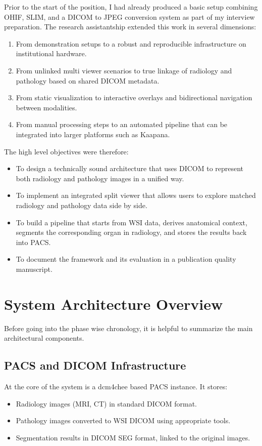 \documentclass[11pt,a4paper]{article}
\begin{document}
Prior to the start of the position, I had already produced a basic setup combining OHIF, SLIM, and a DICOM to JPEG conversion system as part of my interview preparation. The research assistantship extended this work in several dimensions:
\begin{enumerate}
    \item From demonstration setups to a robust and reproducible infrastructure on institutional hardware.
    \item From unlinked multi viewer scenarios to true linkage of radiology and pathology based on shared DICOM metadata.
    \item From static visualization to interactive overlays and bidirectional navigation between modalities.
    \item From manual processing steps to an automated pipeline that can be integrated into larger platforms such as Kaapana.
\end{enumerate}

The high level objectives were therefore:
\begin{itemize}
    \item To design a technically sound architecture that uses DICOM to represent both radiology and pathology images in a unified way.
    \item To implement an integrated split viewer that allows users to explore matched radiology and pathology data side by side.
    \item To build a pipeline that starts from WSI data, derives anatomical context, segments the corresponding organ in radiology, and stores the results back into PACS.
    \item To document the framework and its evaluation in a publication quality manuscript.
\end{itemize}

\section{System Architecture Overview}
\label{sec:architecture}

Before going into the phase wise chronology, it is helpful to summarize the main architectural components.

\subsection{PACS and DICOM Infrastructure}

At the core of the system is a dcm4chee based PACS instance. It stores:
\begin{itemize}
    \item Radiology images (MRI, CT) in standard DICOM format.
    \item Pathology images converted to WSI DICOM using appropriate tools.
    \item Segmentation results in DICOM SEG format, linked to the original images.
\end{itemize}
\end{document}

